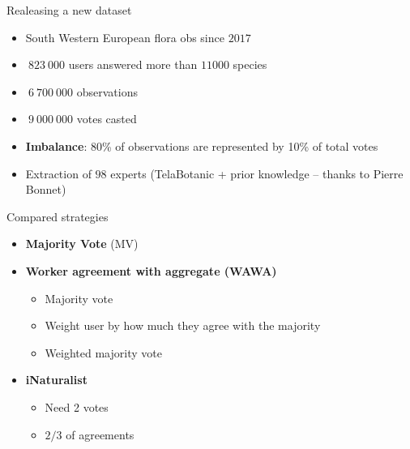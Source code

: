 \begin{frame}{Realeasing a new dataset}{}
    \begin{itemize}
        \item South Western European flora obs since $2017$
        \item $~823\ 000$ users answered more than $11 000$ species
        \item $~6\ 700\ 000$ observations
        \item $~9\ 000\ 000$ votes casted
        \item \textbf{Imbalance}: 80\% of observations are represented by 10\% of total votes
    \end{itemize}
\pause
\vspace{1cm}
\begin{itemize}
    \item Extraction of $98$ experts (TelaBotanic + prior knowledge -- thanks to Pierre Bonnet)
    \vspace{1cm}
\end{itemize}
\end{frame}

\begin{frame}{Compared strategies}{}
    \begin{itemize}
        \item<1-> \textbf{Majority Vote} (MV)
        \item<2-> \textbf{Worker agreement with aggregate (WAWA)} \citep{appen}
            \begin{itemize}
                \item Majority vote
                \item Weight user by how much they agree with the majority
                \item Weighted majority vote
            \end{itemize}
        \item<3-> \textbf{iNaturalist}
        \begin{itemize}
            \item Need 2 votes
            \item $2/3$ of agreements
        \end{itemize}
    \end{itemize}
\end{frame}

